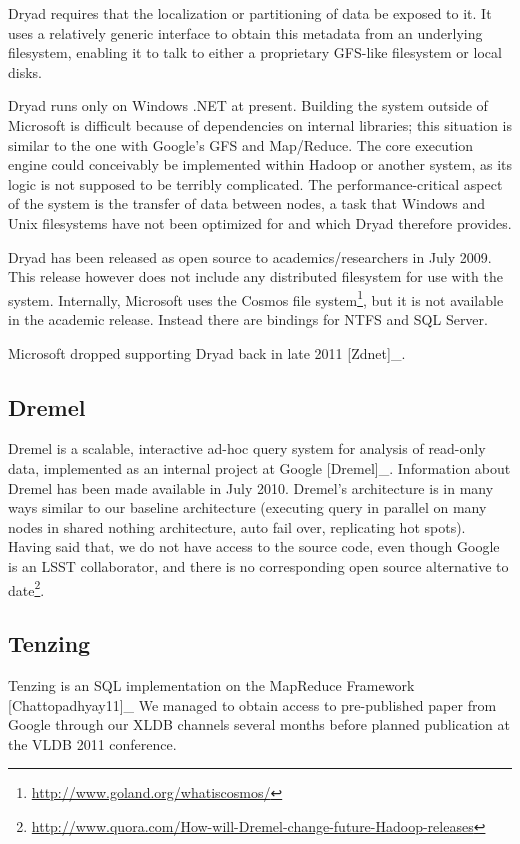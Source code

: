 \documentclass[DM,lsstdraft,toc]{lsstdoc}
\begin{document}
Dryad
requires that the localization or partitioning of data be exposed to it.
It uses a relatively generic interface to obtain this metadata from an
underlying filesystem, enabling it to talk to either a proprietary
GFS-like filesystem or local disks.

Dryad runs
only on Windows .NET at present. Building the system outside of
Microsoft is difficult because of dependencies on internal libraries;
this situation is similar to the one with Google's GFS and Map/Reduce.
The core execution engine could conceivably be implemented within Hadoop
or another system, as its logic is not supposed to be terribly
complicated. The performance-critical aspect of the system is the
transfer of data between nodes, a task that Windows and Unix filesystems
have not been optimized for and which
Dryad
therefore provides.

Dryad has
been released as open source to academics/researchers in July 2009. This
release however does not include any distributed filesystem for use with
the system. Internally, Microsoft uses the
Cosmos file system\footnote{\url{http://www.goland.org/whatiscosmos/}}, but it
is not available in the academic release. Instead there are bindings for
NTFS and SQL Server.

Microsoft dropped supporting
Dryad back
in late 2011 {[}Zdnet{]}\_.

\subsection{Dremel}\label{dremel}

Dremel is a scalable, interactive ad-hoc query system for analysis of
read-only data, implemented as an internal project at Google
{[}Dremel{]}\_. Information about Dremel has been made available in July
2010. Dremel's architecture is in many ways similar to our baseline
architecture (executing query in parallel on many nodes in shared
nothing architecture, auto fail over, replicating hot spots). Having
said that, we do not have access to the source code, even though Google
is an LSST collaborator, and there is
no corresponding open source alternative to date\footnote{\url{http://www.quora.com/How-will-Dremel-change-future-Hadoop-releases}}.

\subsection{Tenzing}\label{tenzing}

Tenzing is an SQL implementation on the MapReduce Framework
{[}Chattopadhyay11{]}\_ We managed to obtain access to pre-published
paper from Google through our XLDB channels
several months before planned publication at the VLDB 2011 conference.
\end{document}
